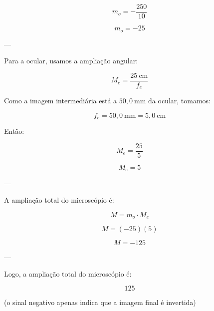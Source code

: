 \documentclass[12pt,a4paper]{article}
\begin{document}
\[
m_o = -\frac{250}{10}
\]

\[
m_o = -25
\]

---

Para a ocular, usamos a ampliação angular:

\[
M_e = \frac{25\ \text{cm}}{f_e}
\]

Como a imagem intermediária está a \(50,0\ \text{mm}\) da ocular, tomamos:

\[
f_e = 50,0\ \text{mm} = 5,0\ \text{cm}
\]

Então:

\[
M_e = \frac{25}{5}
\]

\[
M_e = 5
\]

---

A ampliação total do microscópio é:

\[
M = m_o \cdot M_e
\]

\[
M = (-25)(5)
\]

\[
M = -125
\]

---

Logo, a ampliação total do microscópio é:

\[
\boxed{125}
\]

(o sinal negativo apenas indica que a imagem final é invertida)
\end{document}
